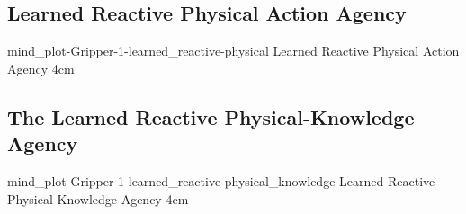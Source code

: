 {\clearpage
  \subsection{Learned Reactive Physical Action Agency}
  \experimentcausegroupplots{\dataappendixmaxtime}
                            {\dataappendixexperimentonemaxtime}
                            {\dataappendixexperimenttwomaxtime}
                            {\dataappendixexperimentthreemaxtime}
                            {\dataappendixexperimentonename}
                            {\dataappendixexperimenttwoname}
                            {\dataappendixexperimentthreename}
                            {\dataappendixexperimentoneprettyname}
                            {\dataappendixexperimenttwoprettyname}
                            \experimentcausegroupplotscontinued{\dataappendixexperimentthreeprettyname}
                                                               {mind_plot-Gripper-1-learned_reactive-physical}
                                                               {Learned Reactive Physical Action Agency}
                                                               {\experimentdatacommontablereference}
                                                               {4cm}
}
{\clearpage
  \subsection{The Learned Reactive Physical-Knowledge Agency}
  \experimentcausegroupplots{\dataappendixmaxtime}
                            {\dataappendixexperimentonemaxtime}
                            {\dataappendixexperimenttwomaxtime}
                            {\dataappendixexperimentthreemaxtime}
                            {\dataappendixexperimentonename}
                            {\dataappendixexperimenttwoname}
                            {\dataappendixexperimentthreename}
                            {\dataappendixexperimentoneprettyname}
                            {\dataappendixexperimenttwoprettyname}
                            \experimentcausegroupplotscontinued{\dataappendixexperimentthreeprettyname}
                                                               {mind_plot-Gripper-1-learned_reactive-physical_knowledge}
                                                               {Learned Reactive Physical-Knowledge Agency}
                                                               {\experimentdatacommontablereference}
                                                               {4cm}
}
